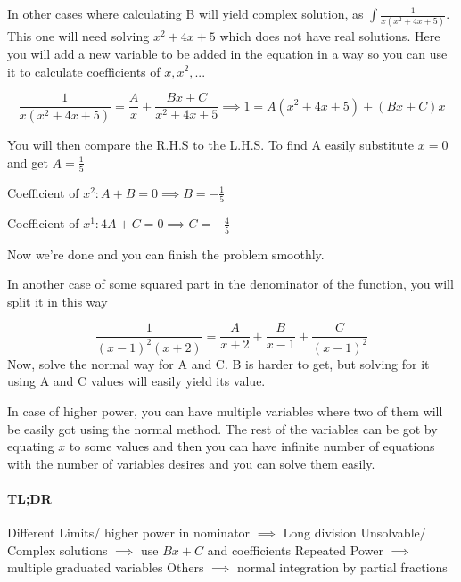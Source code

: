 \documentclass{article}
\begin{document}
In other cases where calculating B will yield complex solution, as $ \int \frac{1}{x(x^2+4x+5)}$.
This one will need solving $ x^2+4x+5 $ which does not have real solutions. Here you will add a new variable to be added in the equation in a way so you can use it to calculate coefficients of $ x, x^2, ... $

	\[	\frac{1}{x(x^2+4x+5)}= \frac{A}{x} + \frac{ Bx+C }{ x^2+4x+5 }  
	\implies 1 = A(x^2+4x+5) + (Bx+C)x
	\]

	You will then compare the R.H.S to the L.H.S. To find A easily substitute $ x=0 $ and get $ A = \frac{1}{5} $ 

	\begin{center}

	Coefficient of $ x^2: A+B = 0 \implies B = -\frac{1}{5}   $ 

	Coefficient of $ x^1: 4A+C = 0 \implies C = -\frac{4}{5} $ 

	\end{center}

	
Now we're done and you can finish the problem smoothly.	



In another case of some squared part in the denominator of the function, you will split it in this way

\[
	\frac{1}{(x-1)^2(x+2)}  = \frac{A}{x+2} + \frac{B}{x-1} + \frac{C}{(x-1)^2}
\]
Now, solve the normal way for A and C. B is harder to get, but solving for it using A and C values will easily yield its value.

In case of higher power, you can have multiple variables where two of them will be easily got using the normal method. The rest of the variables can be got by equating $x$ to some values and then you can have infinite number of equations with the number of variables desires and you can solve them easily. 

\paragraph{TL;DR}
Different Limits/ higher power in nominator $ \implies $ Long division \newline
Unsolvable/ Complex solutions $ \implies $ use $ Bx+C $ and coefficients \newline
Repeated Power $ \implies $ multiple graduated variables\newline
Others $ \implies $ normal integration by partial fractions
\end{document}
